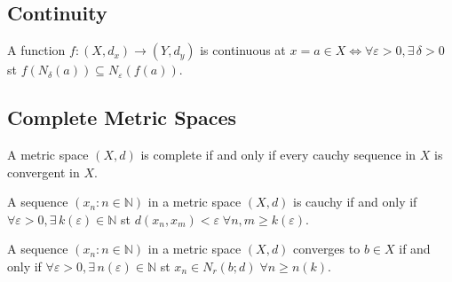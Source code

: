 \documentclass{article}
\begin{document}
\subsection{Continuity}

A function $f:(X,d_x) \rightarrow (Y,d_y)$ is continuous at $x=a \in X \iff \forall \varepsilon > 0, \exists \, \delta > 0$ st $f(N_\delta(a)) \subseteq N_\varepsilon(f(a))$.

\subsection{Complete Metric Spaces}

A metric space $(X,d)$ is complete if and only if every cauchy sequence in $X$ is convergent in $X$.

A sequence $(x_n: n \in \mathbb{N})$ in a metric space $(X,d)$ is cauchy if and only if $\forall \varepsilon > 0, \exists \, k(\varepsilon) \in \mathbb{N}$ st $d(x_n, x_m) < \varepsilon \; \forall n,m \geq k(\varepsilon)$.

A sequence $(x_n: n \in \mathbb{N})$ in a metric space $(X, d)$ converges to $b \in X$ if and only if $\forall \varepsilon > 0, \exists \, n(\varepsilon) \in \mathbb{N}$ st $x_n \in N_r(b;d) \; \forall n \geq n(k)$. 
\end{document}
